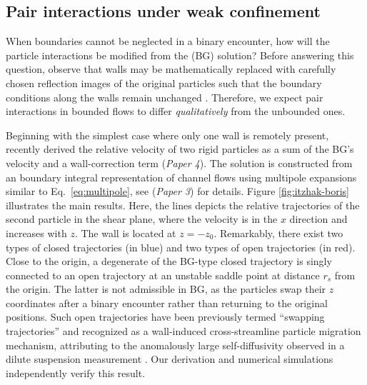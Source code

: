 \subsection{Pair interactions under weak confinement}

When boundaries cannot be neglected in a binary encounter, how will the particle interactions be modified from the \cite{batchelor_green_1972} (BG) solution?
Before answering this question, observe that walls may be mathematically replaced with carefully chosen reflection images of the original particles such that the boundary conditions along the walls remain unchanged \citep{blake_1971, LironMochon}.
Therefore, we expect pair interactions in bounded flows to differ \emph{qualitatively} from the unbounded ones.

Beginning with the simplest case where only one wall is remotely present, \cite{Fouxon_Rubinstein2019} recently derived the relative velocity of two rigid particles as a sum of the BG's velocity and a wall-correction term (\emph{Paper 4}). The solution is constructed from an boundary integral representation of channel flows using multipole expansions similar to Eq.\ \eqref{eq:multipole}, see \cite{Fouxon_2017} (\emph{Paper 3}) for details.
Figure \ref{fig:itzhak-boris} illustrates the main results.
Here, the lines depicts the relative trajectories of the second particle in the shear plane, where the velocity is in the $x$ direction and increases with $z$. The wall is located at $z=-z_0$.
Remarkably, there exist two types of closed trajectories (in blue) and two types of open trajectories (in red).
Close to the origin, a degenerate of the BG-type closed trajectory is singly connected to an open trajectory at an unstable saddle point at distance $r_s$ from the origin.
The latter is not admissible in BG, as the particles swap their $z$ coordinates after a binary encounter rather than returning to the original positions.
Such open trajectories have been previously termed ``swapping trajectories'' and recognized as a wall-induced cross-streamline particle migration mechanism, attributing to the anomalously large self-diffusivity observed in a dilute suspension measurement \citep{Zarraga_Leighton2002, zurita-gotor_2007}.
Our derivation and numerical simulations independently verify this result.

